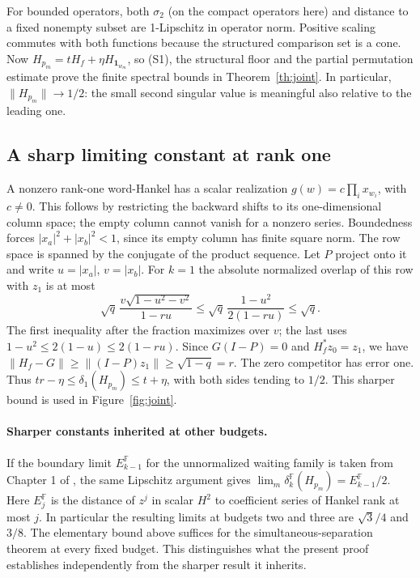 For bounded operators, both \(\sigma_2\) (on the compact operators here) and distance to a fixed nonempty subset are 1-Lipschitz in operator norm. Positive scaling commutes with both functions because the structured comparison set is a cone. Now \(H_{p_m}=tH_f+\eta H_{\mathbf1_{w_m}}\), so (S1), the structural floor and the partial permutation estimate prove the finite spectral bounds in Theorem~\ref{th:joint}. In particular, \(\|H_{p_m}\|\to1/2\): the small second singular value is meaningful also relative to the leading one.

\subsection{A sharp limiting constant at rank one}
A nonzero rank-one word-Hankel has a scalar realization \(g(w)=c\prod_{i}x_{w_i}\), with \(c\ne0\). This follows by restricting the backward shifts to its one-dimensional column space; the empty column cannot vanish for a nonzero series. Boundedness forces \(|x_a|^2+|x_b|^2<1\), since its empty column has finite square norm. The row space is spanned by the conjugate of the product sequence. Let \(P\) project onto it and write \(u=|x_a|\), \(v=|x_b|\). For \(k=1\) the absolute normalized overlap of this row with \(z_1\) is at most
\[
 \sqrt q\,\frac{v\sqrt{1-u^2-v^2}}{1-ru}
 \le\sqrt q\,\frac{1-u^2}{2(1-ru)}
 \le\sqrt q .
\]
The first inequality after the fraction maximizes over \(v\); the last uses \(1-u^2\le2(1-u)\le2(1-ru)\). Since \(G(I-P)=0\) and \(H_f^*z_0=z_1\), we have \(\|H_f-G\|\ge\|(I-P)z_1\|\ge\sqrt{1-q}=r\). The zero competitor has error one. Thus \(tr-\eta\le\delta_1(H_{p_m})\le t+\eta\), with both sides tending to \(1/2\). This sharper bound is used in Figure~\ref{fig:joint}.

\paragraph{Sharper constants inherited at other budgets.}
If the boundary limit \(E_{k-1}^{\mathbb F}\) for the unnormalized waiting family is taken from Chapter 1 of \cite{draga}, the same Lipschitz argument gives \(\lim_m\delta_k^{\mathbb F}(H_{p_m})=E_{k-1}^{\mathbb F}/2\). Here \(E_j^{\mathbb F}\) is the distance of \(z^j\) in scalar \(H^2\) to coefficient series of Hankel rank at most \(j\). In particular the resulting limits at budgets two and three are \(\sqrt3/4\) and \(3/8\). The elementary bound above suffices for the simultaneous-separation theorem at every fixed budget. This distinguishes what the present proof establishes independently from the sharper result it inherits.

